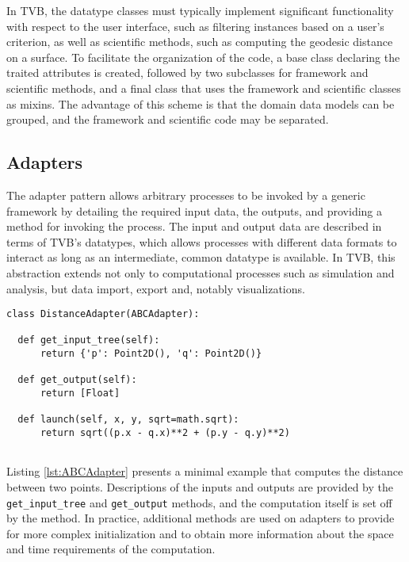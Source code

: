 \documentclass{bioinfo}
\begin{document}
In TVB, the datatype classes must typically implement significant functionality
with respect to the user interface, such as filtering instances based on a
user's criterion, as well as scientific methods, such as computing the geodesic
distance on a surface. To facilitate the organization of the code, a base class
declaring the traited attributes is created, followed by two subclasses for 
framework and scientific methods, and a final class that uses the framework and
scientific classes as mixins. The advantage of this scheme is that the domain 
data models can be grouped, and the framework and scientific code may be separated. 

\subsection{Adapters}

The adapter pattern allows arbitrary processes to be invoked by a generic 
framework by detailing the required input data, the outputs, and providing a
method for invoking the process. The input and output data are described in terms of 
TVB's datatypes, which allows processes with different data formats 
to interact as long as an intermediate, common datatype is available. In
TVB, this abstraction extends not only to computational processes such as 
simulation and analysis, but data import, export and, notably visualizations. 

\begin{lstlisting}[caption={Example of a minimal adapter},
                   label={lst:ABCAdapter}]
class DistanceAdapter(ABCAdapter):

  def get_input_tree(self):
      return {'p': Point2D(), 'q': Point2D()}

  def get_output(self):
      return [Float]

  def launch(self, x, y, sqrt=math.sqrt):
      return sqrt((p.x - q.x)**2 + (p.y - q.y)**2)
  	
\end{lstlisting}

Listing \ref{lst:ABCAdapter} presents a minimal example that computes the
distance between two points. Descriptions of the inputs and outputs are
provided by the \texttt{get\_input\_tree} and \texttt{get\_output} methods, and
the computation itself is set off by the \texttt{} method. 
In practice, additional methods are used on adapters to provide for more 
complex initialization and to obtain more information about the space and 
time requirements of the computation. 
\end{document}
